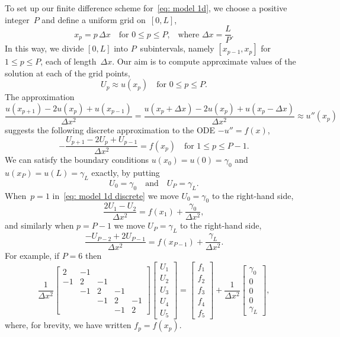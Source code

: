 To set up our finite difference scheme for~\eqref{eq: model 1d}, we choose a 
positive integer~$P$ and define a uniform grid on~$[0,L]$,
\[
x_p=p\,\Delta x\quad\text{for $0\le p\le P$,}
	\quad\text{where $\Delta x=\frac{L}{P}$.}
\]
In this way, we divide $[0,L]$ into $P$~subintervals, namely $[x_{p-1},x_p]$
for~$1\le p\le P$, each of length~$\Delta x$.  Our aim is to compute 
approximate values of the solution at each of the grid points,
\[
U_p\approx u(x_p)\quad\text{for $0\le p\le P$.}
\]
The approximation
\begin{equation}\label{eq: u'' approx}
\frac{u(x_{p+1})-2u(x_p)+u(x_{p-1})}{\Delta x^2}
	=\frac{u(x_p+\Delta x)-2u(x_p)+u(x_p-\Delta x)}{\Delta x^2}
	\approx u''(x_p)
\end{equation}
suggests the following discrete approximation to the ODE $-u''=f(x)$,
\begin{equation}\label{eq: model 1d discrete}
-\frac{U_{p+1}-2U_p+U_{p-1}}{\Delta x^2}=f(x_p)\quad\text{for $1\le p\le P-1$.}
\end{equation}
We can satisfy the boundary conditions $u(x_0)=u(0)=\gamma_0$ and 
$u(x_P)=u(L)=\gamma_L$ exactly, by putting
\[
U_0=\gamma_0\quad\text{and}\quad U_P=\gamma_L.
\]
When~$p=1$ in~\eqref{eq: model 1d discrete} we move $U_0=\gamma_0$ to the 
right-hand side, 
\[
\frac{2U_1-U_2}{\Delta x^2}=f(x_1)+\frac{\gamma_0}{\Delta x^2},
\]
and similarly when $p=P-1$ we move $U_P=\gamma_L$ to the right-hand side,
\[
\frac{-U_{P-2}+2U_{P-1}}{\Delta x^2}=f(x_{P-1})+\frac{\gamma_L}{\Delta x^2}.
\]
For example, if $P=6$ then
\begin{equation}\label{eq: model 1d linear system}
\frac{1}{\Delta x^2}\begin{bmatrix}
 2&-1&  & &\\
-1& 2&-1& &\\
  &-1& 2&-1&\\
  &  &-1& 2&-1\\
  &  &  &-1& 2
\end{bmatrix}
\begin{bmatrix}U_1\\ U_2\\ U_3\\ U_4\\ U_5\end{bmatrix}
=\begin{bmatrix}f_1\\ f_2\\ f_3\\ f_4\\ f_5 \end{bmatrix}
+\frac{1}{\Delta x^2}
\begin{bmatrix}\gamma_0\\ 0\\ 0 \\ 0\\ \gamma_L \end{bmatrix},
\end{equation}
where, for brevity, we have written $f_p=f(x_p)$.


